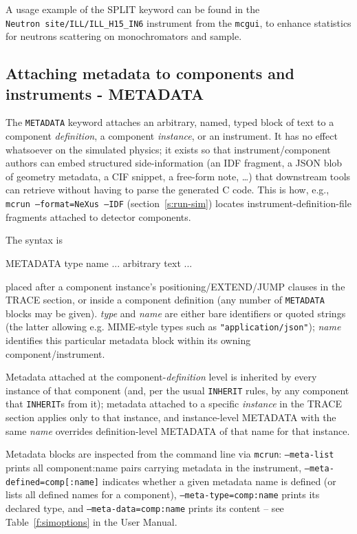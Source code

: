A usage example of the SPLIT keyword can be found in the \\
\verb+Neutron site/ILL/ILL_H15_IN6+ instrument from the \verb+mcgui+, to enhance
statistics for neutrons scattering on monochromators and sample.

\subsection{Attaching metadata to components and instruments - METADATA}
\label{s:metadata}

The \texttt{METADATA} keyword attaches an arbitrary, named, typed block of
text to a component \emph{definition}, a component \emph{instance}, or an
instrument. It has no effect whatsoever on the simulated physics; it exists
so that instrument/component authors can embed structured side-information
(an IDF fragment, a JSON blob of geometry metadata, a CIF snippet, a free-form
note, \ldots) that downstream tools can retrieve without having to parse the
generated C code. This is how, e.g., \texttt{mcrun --format=NeXus --IDF}
(section~\ref{s:run-sim}) locates instrument-definition-file fragments
attached to detector components.

The syntax is
\begin{mcstas}
METADATA type name
  ... arbitrary text ...
\end{mcstas}
placed after a component instance's positioning/EXTEND/JUMP clauses in the
TRACE section, or inside a component definition (any number of
\texttt{METADATA} blocks may be given). \textit{type} and \textit{name} are
either bare identifiers or quoted strings (the latter allowing e.g. MIME-style
types such as \texttt{"application/json"}); \textit{name} identifies this
particular metadata block within its owning component/instrument.

Metadata attached at the component-\emph{definition} level is inherited by
every instance of that component (and, per the usual \texttt{INHERIT} rules,
by any component that \texttt{INHERIT}s from it); metadata attached to a
specific \emph{instance} in the TRACE section applies only to that instance,
and instance-level METADATA with the same \textit{name} overrides
definition-level METADATA of that name for that instance.

Metadata blocks are inspected from the command line via \verb+mcrun+:
\texttt{--meta-list} prints all component:name pairs carrying metadata in
the instrument, \texttt{--meta-defined=comp[:name]} indicates whether a
given metadata name is defined (or lists all defined names for a component),
\texttt{--meta-type=comp:name} prints its declared type, and
\texttt{--meta-data=comp:name} prints its content -- see
Table~\ref{f:simoptions} in the User Manual.

